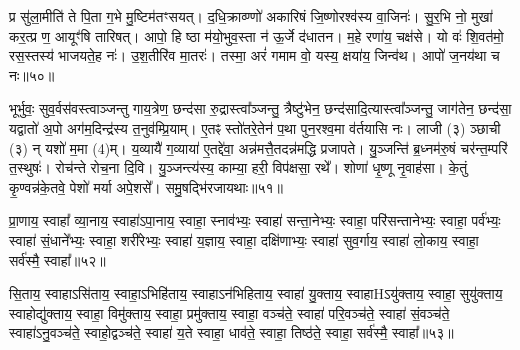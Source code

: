 प्र सु॑ला॒मीति॑ ते पि॒ता ग॒भे मु॒ष्टिम॑तꣳसयत्। द॒धि॒क्राव्ण्णो॑ अकारिषं जि॒ष्णोरश्व॑स्य वा॒जिनः॑। सु॒र॒भि नो॒ मुखा॑ कर॒त्प्र ण॒ आयूꣳ॑षि तारिषत्। आपो॒ हि ष्ठा म॑यो॒भुव॒स्ता न॑ ऊ॒र्जे द॑धातन। म॒हे रणा॑य॒ चक्ष॑से। यो वः॑ शि॒वत॑मो॒ रस॒स्तस्य॑ भाजयते॒ह नः॑। उ॒श॒तीरि॑व मा॒तरः॑। तस्मा॒ अरं॑ गमाम वो॒ यस्य॒ क्षया॑य॒ जिन्व॑थ। आपो॑ ज॒नय॑था च नः॥५०॥

{\anuvakamend[{आ॒सा॒मत्ति॒ न रो॑हतो॒ जिन्व॑थ च॒त्वारि॑ च॥19॥}]}

भूर्भुवः॒ सुव॒र्वस॑वस्त्वाञ्जन्तु गाय॒त्रेण॒ छन्द॑सा रु॒द्रास्त्वा᳚ञ्जन्तु॒ त्रैष्टु॑भेन॒ छन्द॑सादि॒त्यास्त्वा᳚ञ्जन्तु॒ जाग॑तेन॒ छन्द॑सा॒ यद्वातो॑ अ॒पो अग॑म॒दिन्द्र॑स्य त॒नुव॑म्प्रि॒याम्। ए॒तꣴ स्तो॑तरे॒तेन॑ प॒था पुन॒रश्व॒मा व॑र्तयासि नः। लाजी (३) ञ्छाची (३) न् यशो॑ म॒मा (4)म्। य॒व्यायै॑ ग॒व्याया॑ ए॒तद्दे॑वा॒ अन्न॑मत्तै॒तदन्न॑मद्धि प्रजापते। यु॒ञ्जन्ति॑ ब्र॒ध्नम॑रु॒षं चर॑न्त॒म्परि॑ त॒स्थुषः॑। रोच॑न्ते रोच॒ना दि॒वि। यु॒ञ्जन्त्य॑स्य॒ काम्या॒ हरी॒ विप॑क्षसा॒ रथे᳚। शोणा॑ धृ॒ष्णू नृ॒वाह॑सा। के॒तुं कृ॒ण्वन्न॑के॒तवे॒ पेशो॑ मर्या अपे॒शसे᳚। समु॒षद्भि॑रजायथाः॥५१॥

{\anuvakamend[{ब्र॒ध्नं पञ्च॑विꣳशतिश्च॥20॥}]}

प्रा॒णाय॒ स्वाहा᳚ व्या॒नाय॒ स्वाहा॑\-ऽपा॒नाय॒ स्वाहा॒ स्नाव॑भ्यः॒ स्वाहा॑ सन्ता॒नेभ्यः॒ स्वाहा॒ परि॑सन्तानेभ्यः॒ स्वाहा॒ पर्व॑भ्यः॒ स्वाहा॑ सं॒धाने᳚भ्यः॒ स्वाहा॒ शरी॑रेभ्यः॒ स्वाहा॑ य॒ज्ञाय॒ स्वाहा॒ दक्षि॑णाभ्यः॒ स्वाहा॑ सुव॒र्गाय॒ स्वाहा॑ लो॒काय॒ स्वाहा॒ सर्व॑स्मै॒ स्वाहा᳚॥५२॥

{\anuvakamend[{प्रा॒णाया॒ष्टाविꣳ॑शतिः॥21॥}]}

सि॒ताय॒ स्वाहा\-ऽसि॑ताय॒ स्वाहा॒\-ऽभिहि॑ताय॒ स्वाहा\-ऽन॑भिहिताय॒ स्वाहा॑ यु॒क्ताय॒ स्वाहाH\-ऽयु॑क्ताय॒ स्वाहा॒ सुयु॑क्ताय॒ स्वाहोद्यु॑क्ताय॒ स्वाहा॒ विमु॑क्ताय॒ स्वाहा॒ प्रमु॑क्ताय॒ स्वाहा॒ वञ्च॑ते॒ स्वाहा॑ परि॒वञ्च॑ते॒ स्वाहा॑ सं॒वञ्च॑ते॒ स्वाहा॑\-ऽनु॒वञ्च॑ते॒ स्वाहो॒द्वञ्च॑ते॒ स्वाहा॑ य॒ते स्वाहा॒ धाव॑ते॒ स्वाहा॒ तिष्ठ॑ते॒ स्वाहा॒ सर्व॑स्मै॒ स्वाहा᳚॥५३॥

{\anuvakamend[{सि॒ताया॒ष्टात्रिꣳ॑शत्॥22॥}]}


{}

